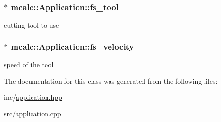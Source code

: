 \subsubsection[{\texorpdfstring{fs\+\_\+tool}{fs_tool}}]{$\ast$ mcalc\+::\+Application\+::fs\+\_\+tool\hspace{0.3cm}{\ttfamily [protected]}}\hypertarget{classmcalc_1_1Application_a9775057e24515e6e3cf8c1c9a3144512}{}\label{classmcalc_1_1Application_a9775057e24515e6e3cf8c1c9a3144512}
cutting tool to use 
\subsubsection[{\texorpdfstring{fs\+\_\+velocity}{fs_velocity}}]{$\ast$ mcalc\+::\+Application\+::fs\+\_\+velocity\hspace{0.3cm}{\ttfamily [protected]}}\hypertarget{classmcalc_1_1Application_a6d4441380476fcbdafe23b28da5f6647}{}\label{classmcalc_1_1Application_a6d4441380476fcbdafe23b28da5f6647}
speed of the tool 

The documentation for this class was generated from the following files\+:\begin{DoxyCompactItemize}
\item 
inc/\hyperlink{application_8hpp}{application.\+hpp}\item 
src/application.\+cpp\end{DoxyCompactItemize}
